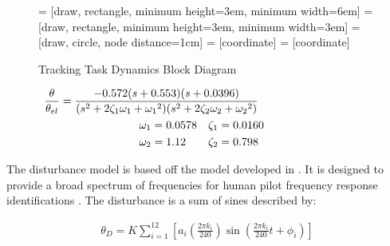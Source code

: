 \begin{figure}
    \centering
    \centering
     = [draw, rectangle, minimum height=3em, minimum width=6em]
     = [draw, rectangle, minimum height=3em, minimum width=3em]
     = [draw, circle, node distance=1cm]
     = [coordinate]
     = [coordinate]
    \medskip
    \caption{Tracking Task Dynamics Block Diagram}
    \label{fig:de_block_diagram}
\end{figure}

\begin{align}
    \mathclap{ %
        \frac{\theta}{\theta_{el}}
        =
        \frac{
            -0.572 (s+0.553) (s+0.0396)
        }{
            (s^2 + 2\zeta_1 \omega_1 + {\omega_1}^2)
            (s^2 + 2\zeta_2 \omega_2 + {\omega_2}^2)
        }
    }\\
    \omega_1 &= 0.0578 & \zeta_1 &= 0.0160 \nonumber \\
    \omega_2 &= 1.12 & \zeta_2 &= 0.798 \nonumber
\end{align}

The disturbance model is based off the model developed in \citet{sweet_identification_1999}.
It is designed to provide a broad spectrum of frequencies for human pilot frequency response identifications \citep{mcruer_mathematical_1974}.
The disturbance is a sum of sines described by:

\begin{align}
    \theta_D = K\sum\limits_{i=1}^{12} \left[ a_i \left(\frac{2\pi k_i}{240} \right) \sin\left( \frac{2\pi k_i}{240}t + \phi_i \right) \right]
\end{align}

